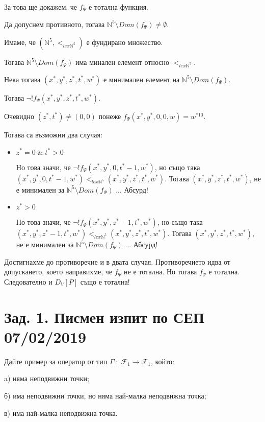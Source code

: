 \documentclass{article}
\begin{document}
За това ще докажем, че \(f_\Psi\) е тотална функция.

Да допуснем противното, тогава \(\mathbb{N}^5 \setminus Dom(f_\Psi) \neq \emptyset\).

Имаме, че \((\mathbb{N}^5, <_{lex \mathbb{N}^5})\) е фундирано множество.

Тогава \(\mathbb{N}^5 \setminus Dom(f_\Psi)\) има минален елемент относно \(<_{lex \mathbb{N}^5}\).

Нека тогава \((x^*, y^*, z^*, t^*, w^*)\) е минимален елемент на \(\mathbb{N}^5 \setminus Dom(f_\Psi)\).

Тогава \(\lnot!f_\Psi(x^*, y^*, z^*, t^*, w^*)\).

Очевидно \((z^*, t^*) \neq (0, 0)\) понеже \(f_\Psi(x^*, y^*, 0, 0, w) = w^{*10}\).

Тогава са възможни два случая:
\begin{itemize}
\item \(z^* = 0 \; \& \; t^* > 0\)

Но това значи, че \(\lnot ! f_\Psi(x^*, y^*, 0, t^* - 1, w^*)\),
но също така \((x^*, y^*, 0, t^* - 1, w^*) <_{lex \mathbb{N}^5} (x^*, y^*, z^*, t^*, w^*)\).
Тогава \((x^*, y^*, z^*, t^*, w^*)\), не е минимален за \(\mathbb{N}^5 \setminus Dom(f_\Psi)\) ... Абсурд!

\item \(z^* > 0\)

Но това значи, че \(\lnot ! f_\Psi(x^*, y^*, z^* - 1, t^*, w^*)\),
но също така \((x^*, y^*, z^* - 1, t^*, w^*) <_{lex \mathbb{N}^5} (x^*, y^*, z^*, t^*, w^*)\).
Тогава \((x^*, y^*, z^*, t^*, w^*)\), не е минимален за \(\mathbb{N}^5 \setminus Dom(f_\Psi)\) ... Абсурд!
\end{itemize}

Достигнахме до противоречие и в двата случая.
Противоречието идва от допускането, което направихме, че \(f_\Psi\) не е тотална.
Но тогава \(f_\Psi\) е тотална. Следователно и \(D_V[P]\) също е тотална!

\section*{Зад. 1. Писмен изпит по СЕП 07/02/2019}
Дайте пример за оператор от тип \(\Gamma \; : \; \mathcal{F}_1 \to \mathcal{F}_1\), който:

a) няма неподвижни точки;

б) има неподвижни точки, но няма най-малка неподвижна точка;

в) има най-малка неподвижна точка.
\end{document}
